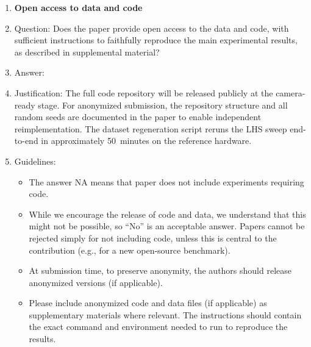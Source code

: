 \documentclass{article}
\begin{document}
\begin{enumerate}
\item {\bf Open access to data and code}
    \item[] Question: Does the paper provide open access to the data and code, with sufficient instructions to faithfully reproduce the main experimental results, as described in supplemental material?
    \item[] Answer: \answerYes{}
    \item[] Justification: The full code repository will be released publicly at the camera-ready stage. For anonymized submission, the repository structure and all random seeds are documented in the paper to enable independent reimplementation. The dataset regeneration script reruns the LHS sweep end-to-end in approximately 50~minutes on the reference hardware.
    \item[] Guidelines:
    \begin{itemize}
        \item The answer NA means that paper does not include experiments requiring code.
        \item While we encourage the release of code and data, we understand that this might not be possible, so “No” is an acceptable answer. Papers cannot be rejected simply for not including code, unless this is central to the contribution (e.g., for a new open-source benchmark).
        \item At submission time, to preserve anonymity, the authors should release anonymized versions (if applicable).
        \item Please include anonymized code and data files (if applicable) as supplementary materials where relevant. The instructions should contain the exact command and environment needed to run to reproduce the results.
    \end{itemize}


\end{enumerate}
\end{document}
